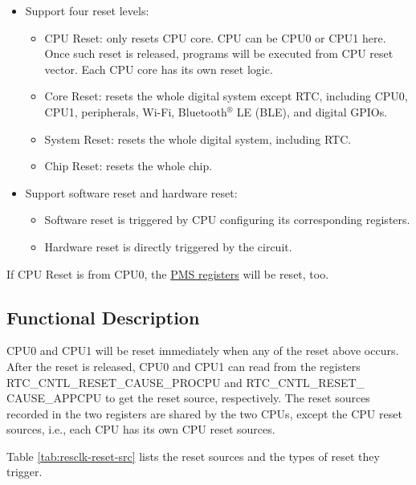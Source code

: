 \documentclass[main\_\_EN.tex]{subfiles}
\begin{document}
\begin{itemize}
    \item Support four reset levels:
    \begin{itemize}
    \item CPU Reset: only resets CPU core. CPU can be CPU0 or CPU1 here. Once such reset is released, programs will be executed from CPU reset vector. Each CPU core has its own reset logic.
    \item Core Reset: resets the whole digital system except RTC, including CPU0, CPU1, peripherals, Wi-Fi, Bluetooth$^®$ LE (BLE), and digital GPIOs.
    \item System Reset: resets the whole digital system, including RTC.
    \item Chip Reset: resets the whole chip.
\end{itemize}
    \item Support software reset and hardware reset:
    \begin{itemize}
        \item Software reset is triggered by CPU configuring its corresponding registers.
        \item Hardware reset is directly triggered by the circuit.
    \end{itemize}
\end{itemize}
\begin{tiplisting}
If CPU Reset is from CPU0, the \hyperref[mod:permctrl]{PMS registers} will be reset, too. 
\end{tiplisting}


\subsection{Functional Description}
CPU0 and CPU1 will be reset immediately when any of the reset above occurs. After the reset is released, CPU0 and CPU1 can read from the registers RTC\_CNTL\_RESET\_CAUSE\_PROCPU and RTC\_CNTL\_RESET\_\\CAUSE\_APPCPU to get the reset source, respectively. The reset sources recorded in the two registers are shared by the two CPUs, except the CPU reset sources, i.e., each CPU has its own CPU reset sources.

Table \ref{tab:resclk-reset-src} lists the reset sources and the types of reset they trigger.
\end{document}
